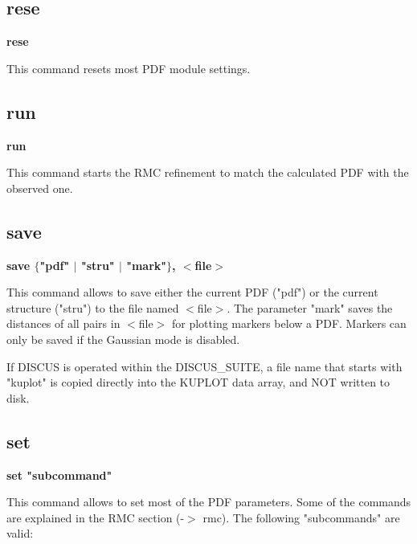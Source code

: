 \subsection*{rese}
{\bf rese \par }
\par
\vspace{3pt}
This command resets most PDF module settings. 
\subsection*{run}
{\bf run \par }
\par
\vspace{3pt}
This command starts the RMC refinement to match the calculated 
PDF with the observed one. 
\subsection*{save}
{\bf save $ \{$"pdf" $| $ "stru" $| $ "mark"$\} $, $ <$file$> $ \par }
\par
\vspace{3pt}
This command allows to save either the current PDF ("pdf") or 
the current structure ("stru") to the file named $ <$file$> $. The 
parameter "mark" saves the distances of all pairs in $ <$file$> $ 
for plotting markers below a PDF. Markers can only be saved 
if the Gaussian mode is disabled. 
\par
If DISCUS is operated within the DISCUS\_SUITE, a file name 
that starts with "kuplot" is copied directly into the KUPLOT 
data array, and NOT written to disk. 
\subsection*{set}
{\bf set "subcommand" \par }
\par
\vspace{3pt}
This command allows to set most of the PDF parameters.  Some of 
the commands are explained in the RMC section (-$> $ rmc). The following 
"subcommands" are valid: 
\par
